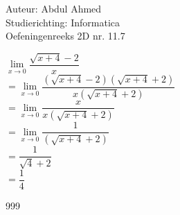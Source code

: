 \documentclass[a4paper]{article}
\begin{document}
  
\noindent \large Auteur: Abdul Ahmed \\
\noindent \large Studierichting: Informatica\\
\noindent \large Oefeningenreeks 2D nr. 11.7\\

\medskip

\normalsize

$\lim\limits_{x \to 0}\dfrac{\sqrt{x+4}-2}{x}$\\

$=\lim\limits_{x \to 0}\dfrac{\left(\sqrt{x+4}-2\right)\left(\sqrt{x+4}+2\right)}{x\left(\sqrt{x+4}+2\right)}$\\

$=\lim\limits_{x \to 0}\dfrac{x}{x\left(\sqrt{x+4}+2\right)}$\\

$=\lim\limits_{x \to 0}\dfrac{1}{\left(\sqrt{x+4}+2\right)}$\\

$=\dfrac{1}{\sqrt{4}+2}$\\

$=\dfrac{1}{4}$\\

\begin{thebibliography}{999}
\end{thebibliography}
\end{document}
